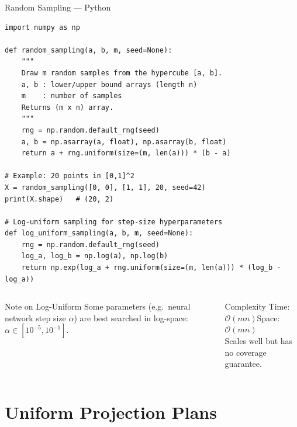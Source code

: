\documentclass[aspectratio=169,10pt]{beamer}
\begin{document}
\begin{frame}[fragile]{Random Sampling --- Python}
  \begin{lstlisting}[style=python, caption={Random sampling with NumPy}]
import numpy as np

def random_sampling(a, b, m, seed=None):
    """
    Draw m random samples from the hypercube [a, b].
    a, b : lower/upper bound arrays (length n)
    m    : number of samples
    Returns (m x n) array.
    """
    rng = np.random.default_rng(seed)
    a, b = np.asarray(a, float), np.asarray(b, float)
    return a + rng.uniform(size=(m, len(a))) * (b - a)

# Example: 20 points in [0,1]^2
X = random_sampling([0, 0], [1, 1], 20, seed=42)
print(X.shape)   # (20, 2)

# Log-uniform sampling for step-size hyperparameters
def log_uniform_sampling(a, b, m, seed=None):
    rng = np.random.default_rng(seed)
    log_a, log_b = np.log(a), np.log(b)
    return np.exp(log_a + rng.uniform(size=(m, len(a))) * (log_b - log_a))
  \end{lstlisting}
  \vspace{0.3em}
  \begin{columns}
    \begin{exampleblock}{Note on Log-Uniform}
      Some parameters (e.g.\ neural network step size $\alpha$) are
      best searched in log-space:
      $\alpha \in [10^{-5}, 10^{-1}]$.
    \end{exampleblock}
    \begin{exampleblock}{Complexity}
      Time: $\mathcal{O}(mn)$\quad Space: $\mathcal{O}(mn)$\\
      Scales well but has no coverage guarantee.
    \end{exampleblock}
  \end{columns}
\end{frame}

\section{Uniform Projection Plans}
\end{document}
